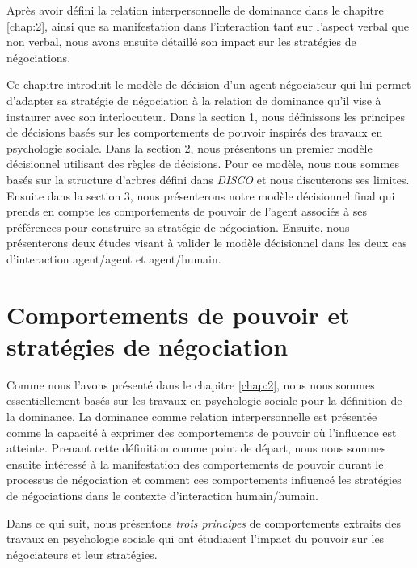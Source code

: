 Après avoir défini la relation interpersonnelle de dominance dans le chapitre \ref{chap:2}, ainsi que sa manifestation dans l'interaction tant sur l'aspect verbal que non verbal, nous avons ensuite détaillé son impact sur les stratégies de négociations. 

Ce chapitre introduit le modèle de décision d'un agent négociateur qui lui permet d'adapter sa stratégie de négociation à la relation de dominance qu'il vise à instaurer avec son interlocuteur. Dans la section 1, nous définissons les principes de décisions basés sur les comportements de pouvoir inspirés des travaux en psychologie sociale. Dans la section 2, nous présentons un premier modèle décisionnel utilisant des règles de décisions.  Pour ce modèle, nous nous sommes basés sur la structure d'arbres défini dans \emph{DISCO} \cite{ri} et nous discuterons ses limites. Ensuite dans la section 3, nous présenterons notre modèle décisionnel final qui prends en compte les comportements de pouvoir de l'agent associés à ses préférences pour construire sa stratégie de négociation. Ensuite, nous présenterons deux études visant à valider le modèle décisionnel dans les deux cas d'interaction agent/agent et agent/humain.

\section{Comportements de pouvoir et stratégies de négociation}
\label{chap:power}
 Comme nous l'avons présenté dans le chapitre \ref{chap:2}, nous nous sommes essentiellement basés sur les travaux en psychologie sociale pour la définition de la dominance. 
 La dominance comme relation interpersonnelle est présentée comme la capacité à exprimer des comportements de pouvoir où l'influence est atteinte. Prenant cette définition comme point de départ, nous nous sommes ensuite intéressé à la manifestation des comportements de pouvoir durant le processus de négociation et comment ces comportements influencé les stratégies de négociations dans le contexte d'interaction humain/humain. 
 
 Dans ce qui suit, nous présentons \emph{trois principes} de comportements extraits des travaux en psychologie sociale qui ont étudiaient l'impact du pouvoir sur les négociateurs et leur stratégies.
 
